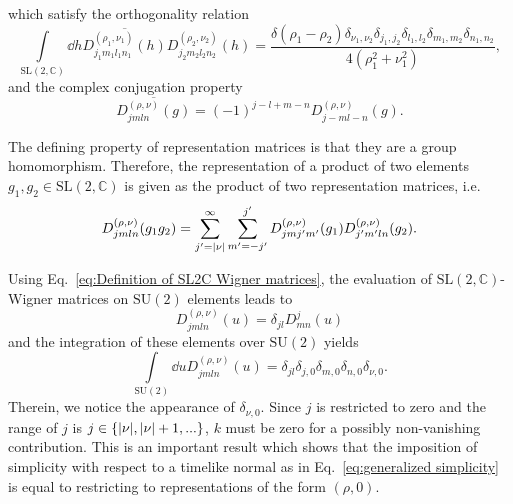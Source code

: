 \documentclass[11pt,a4paper]{article}
\newcommand{\C}{\mathbb C}
\newcommand{\SU}{\text{SU$(2)$}}
\newcommand{\SL}{\text{SL$(2,\C)$}}
\begin{document}
%
which satisfy the orthogonality relation~\cite{Martin-Dussaud:2019ypf}
%
\begin{equation}\label{eq:orthogonality relation of SL2C wigner matrices}
\int\limits_{\SL}\dd{h}\overline{D^{(\rho_1,\nu_1)}_{j_1 m_1 l_1 n_1}(h)}D^{(\rho_2,\nu_2)}_{j_2 m_2 l_2 n_2}(h)
=
\frac{\delta(\rho_1-\rho_2)\delta_{\nu_1, \nu_2}\delta_{j_1, j_2}\delta_{l_1, l_2}\delta_{m_1, m_2}\delta_{n_1, n_2}}{4\left(\rho_1^2+\nu_1^2\right)},
\end{equation}
%
and the complex conjugation property~\cite{Speziale:2016axj}
%
\begin{equation}
\overline{D^{(\rho,\nu)}_{jmln}(g)}
=
(-1)^{j-l+m-n}D^{(\rho,\nu)}_{j-ml-n}(g).
\end{equation}

The defining property of representation matrices is that they are a group homomorphism. Therefore, the representation of a product of two elements $g_1,g_2\in\SL$ is given as the product of two representation matrices, i.e.
%
\begin{equation}\label{eq:SL2C-Wigner matrix evaluated on product}
D^{(\rho,\nu)}_{jmln}(g_1g_2) 
=
\sum_{j'=\abs{\nu}}^\infty \sum_{m' = -j'}^{j'}D^{(\rho,\nu)}_{jmj'm'}(g_1)D^{(\rho,\nu)}_{j'm'ln}(g_2).
\end{equation}
%

Using Eq.~\eqref{eq:Definition of SL2C Wigner matrices}, the evaluation of $\SL$-Wigner matrices on $\SU$ elements leads to
%
\begin{equation}\label{eq:Evaluating SL-Wigner matrix on SU elements}
D^{(\rho,\nu)}_{jmln}(u) = \delta_{jl}D^j_{mn}(u)
\end{equation}
and the integration of these elements over $\SU$ yields
%
\begin{equation}
\int\limits_{\SU}\dd{u}D^{(\rho,\nu)}_{jmln}(u)
=
\delta_{jl}\delta_{j,0}\delta_{m,0}\delta_{n,0}\delta_{\nu,0}.
\end{equation}
%
Therein, we notice the appearance of $\delta_{\nu,0}$. Since $j$ is restricted to zero and the range of $j$ is $j\in\{\abs{\nu},\abs{\nu}+1,...\}$, $k$ must be zero for a possibly non-vanishing contribution. This is an important result which shows that the imposition of simplicity with respect to a timelike normal as in Eq.~\eqref{eq:generalized simplicity} is equal to restricting to representations of the form $(\rho,0)$.
\end{document}
